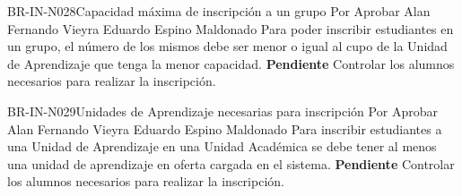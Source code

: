 \begin{BusinessRule}{BR-IN-N028}{Capacidad máxima de inscripción a un grupo}
	{\bcCondition}    %
	{\btTimer}     %
	{\blControlling}    %
	\BRItem[Estado] Por Aprobar
	 Alan Fernando Vieyra
	 Eduardo Espino Maldonado
	\BRItem[Descripción] Para poder inscribir estudiantes en un grupo, el número de los mismos debe ser menor o igual al cupo de la Unidad de Aprendizaje que tenga la menor capacidad.
	\BRItem[Sentencia] \textbf{Pendiente} %
	\BRItem[Motivación] Controlar los alumnos necesarios para realizar la inscripción.
\end{BusinessRule}

\begin{BusinessRule}{BR-IN-N029}{Unidades de Aprendizaje necesarias para inscripción}
	{\bcCondition}    %
	{\btTimer}     %
	{\blControlling}    %
	\BRItem[Estado] Por Aprobar
	 Alan Fernando Vieyra
	 Eduardo Espino Maldonado
	\BRItem[Descripción] Para inscribir estudiantes a una Unidad de Aprendizaje en una Unidad Académica se debe tener al menos una unidad de aprendizaje en oferta cargada en el sistema.
	\BRItem[Sentencia] \textbf{Pendiente} %
	\BRItem[Motivación] Controlar los alumnos necesarios para realizar la inscripción.
\end{BusinessRule}